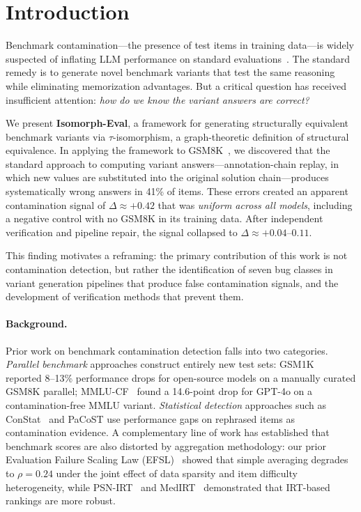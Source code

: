 
\section{Introduction}

Benchmark contamination---the presence of test items in training
data---is widely suspected of inflating LLM performance on standard
evaluations~\cite{zhang2024gsm1k,dekoninck2024constat,mmlucf2024}.
The standard remedy is to generate novel benchmark variants that test
the same reasoning while eliminating memorization advantages. But a
critical question has received insufficient attention: \emph{how do we
know the variant answers are correct?}

We present \textbf{Isomorph-Eval}, a framework for generating
structurally equivalent benchmark variants via $\tau$-isomorphism, a
graph-theoretic definition of structural equivalence. In applying
the framework to GSM8K~\cite{cobbe2021gsm8k}, we discovered that the
standard approach to computing variant answers---annotation-chain
replay, in which new values are substituted into the original
solution chain---produces systematically wrong answers in 41\% of
items. These errors created an apparent contamination signal of
$\Delta \approx +0.42$ that was \emph{uniform across all models},
including a negative control with no GSM8K in its training data.
After independent verification and pipeline repair, the signal
collapsed to $\Delta \approx +0.04$--$0.11$.

This finding motivates a reframing: the primary contribution of this
work is not contamination detection, but rather the identification of
seven bug classes in variant generation pipelines that produce false
contamination signals, and the development of verification methods
that prevent them.

\paragraph{Background.}
Prior work on benchmark contamination detection falls into two
categories. \emph{Parallel benchmark} approaches construct entirely
new test sets: GSM1K~\cite{zhang2024gsm1k} reported 8--13\% performance
drops for open-source models on a manually curated GSM8K parallel;
MMLU-CF~\cite{mmlucf2024} found a 14.6-point drop for GPT-4o on a
contamination-free MMLU variant. \emph{Statistical detection} approaches
such as ConStat~\cite{dekoninck2024constat} and
PaCoST use performance gaps on rephrased items as contamination evidence.
A complementary line of work has established that benchmark scores
are also distorted by aggregation methodology: our prior Evaluation
Failure Scaling Law (EFSL)~\cite{kang2026efsl} showed that simple
averaging degrades to $\rho = 0.24$ under the joint effect of data
sparsity and item difficulty heterogeneity, while
PSN-IRT~\cite{zhou2026psnirt} and MedIRT~\cite{singhal2025medirt}
demonstrated that IRT-based rankings are more robust.

